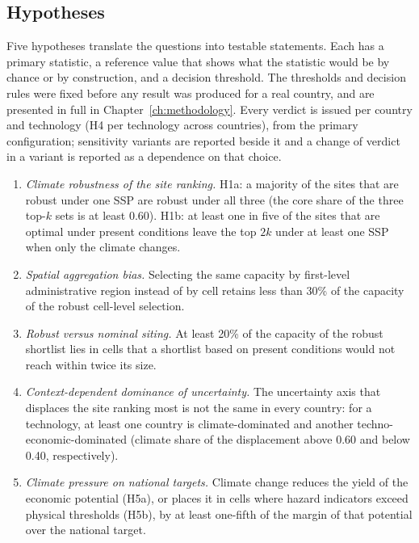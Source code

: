 \subsection{Hypotheses}

Five hypotheses translate the questions into testable statements. Each has a primary statistic, a reference value that shows what the statistic would be by chance or by construction, and a decision threshold. The thresholds and decision rules were fixed before any result was produced for a real country, and are presented in full in Chapter~\ref{ch:methodology}. %
Every verdict is issued per country and technology (H4 per technology across countries), from the primary configuration; sensitivity variants are reported beside it and a change of verdict in a variant is reported as a dependence on that choice.

\begin{enumerate}
    \item[\textbf{H1.}] \textit{Climate robustness of the site ranking.} H1a: a majority of the sites that are robust under one SSP are robust under all three (the core share of the three top-$k$ sets is at least 0.60). H1b: at least one in five of the sites that are optimal under present conditions leave the top $2k$ under at least one SSP when only the climate changes.
    \item[\textbf{H2.}] \textit{Spatial aggregation bias.} Selecting the same capacity by first-level administrative region instead of by cell retains less than 30\% of the capacity of the robust cell-level selection.
    \item[\textbf{H3.}] \textit{Robust versus nominal siting.} At least 20\% of the capacity of the robust shortlist lies in cells that a shortlist based on present conditions would not reach within twice its size.
    \item[\textbf{H4.}] \textit{Context-dependent dominance of uncertainty.} The uncertainty axis that displaces the site ranking most is not the same in every country: for a technology, at least one country is climate-dominated and another techno-economic-dominated (climate share of the displacement above 0.60 and below 0.40, respectively).
    \item[\textbf{H5.}] \textit{Climate pressure on national targets.} Climate change reduces the yield of the economic potential (H5a), or places it in cells where hazard indicators exceed physical thresholds (H5b), by at least one-fifth of the margin of that potential over the national target.
\end{enumerate}

